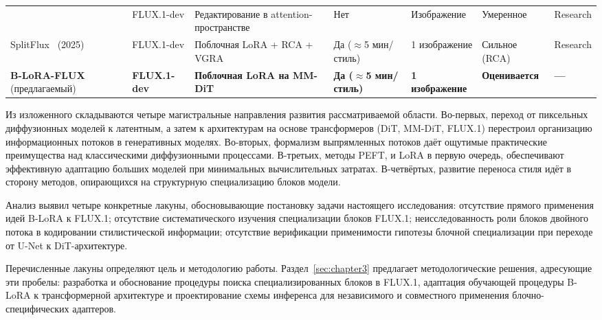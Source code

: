 \begin{landscape}
\begin{table}[p]
\begin{tabular}{p{2.8cm} p{2.2cm} p{4.5cm} p{2.5cm} p{2.0cm} p{2.5cm} p{2.0cm}}
  & FLUX.1-dev
  & Редактирование в attention-пространстве
  & Нет
  & Изображение
  & Умеренное
  & Research \\
\addlinespace
SplitFlux~\cite{yang2025splitflux} (2025)
  & FLUX.1-dev
  & Поблочная LoRA + RCA + VGRA
  & Да (${\approx}$5 мин/стиль)
  & 1 изображение
  & Сильное (RCA)
  & Research \\
\midrule
\textbf{B-LoRA-FLUX} (предлагаемый)
  & \textbf{FLUX.1-dev}
  & \textbf{Поблочная LoRA на MM-DiT}
  & \textbf{Да (${\approx}$5 мин/стиль)}
  & \textbf{1 изображение}
  & \textbf{Оценивается}
  & \textbf{---} \\
\bottomrule
\end{tabular}
\end{table}
\end{landscape}

Из изложенного складываются четыре магистральные направления развития рассматриваемой области. Во-первых, переход от пиксельных диффузионных моделей к латентным, а затем к архитектурам на основе трансформеров (DiT, MM-DiT, FLUX.1) перестроил организацию информационных потоков в генеративных моделях. Во-вторых, формализм выпрямленных потоков даёт ощутимые практические преимущества над классическими диффузионными процессами. В-третьих, методы PEFT, и LoRA в первую очередь, обеспечивают эффективную адаптацию больших моделей при минимальных вычислительных затратах. В-четвёртых, развитие переноса стиля идёт в сторону методов, опирающихся на структурную специализацию блоков модели.

Анализ выявил четыре конкретные лакуны, обосновывающие постановку задачи настоящего исследования: отсутствие прямого применения идей B-LoRA к FLUX.1; отсутствие систематического изучения специализации блоков FLUX.1; неисследованность роли блоков двойного потока в кодировании стилистической информации; отсутствие верификации применимости гипотезы блочной специализации при переходе от U-Net к DiT-архитектуре.

Перечисленные лакуны определяют цель и методологию работы. Раздел~\ref{sec:chapter3} предлагает методологические решения, адресующие эти пробелы: разработка и обоснование процедуры поиска специализированных блоков в FLUX.1, адаптация обучающей процедуры B-LoRA к трансформерной архитектуре и проектирование схемы инференса для независимого и совместного применения блочно-специфических адаптеров.
